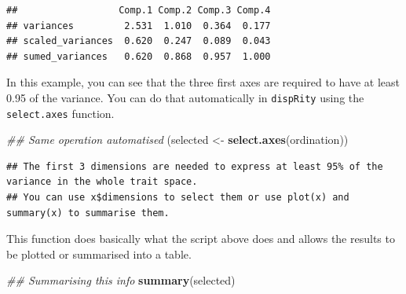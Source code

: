 \documentclass[
]{book}
\newenvironment{Shaded}{\begin{snugshade}}{\end{snugshade}}
\newcommand{\CommentTok}[1]{\textcolor[rgb]{0.56,0.35,0.01}{\textit{#1}}}
\newcommand{\DecValTok}[1]{\textcolor[rgb]{0.00,0.00,0.81}{#1}}
\newcommand{\KeywordTok}[1]{\textcolor[rgb]{0.13,0.29,0.53}{\textbf{#1}}}
\newcommand{\NormalTok}[1]{#1}
\newcommand{\OperatorTok}[1]{\textcolor[rgb]{0.81,0.36,0.00}{\textbf{#1}}}
\newcommand{\StringTok}[1]{\textcolor[rgb]{0.31,0.60,0.02}{#1}}
\begin{document}
\begin{Shaded}
\end{Shaded}

\begin{verbatim}
##                  Comp.1 Comp.2 Comp.3 Comp.4
## variances         2.531  1.010  0.364  0.177
## scaled_variances  0.620  0.247  0.089  0.043
## sumed_variances   0.620  0.868  0.957  1.000
\end{verbatim}

In this example, you can see that the three first axes are required to have at least 0.95 of the variance.
You can do that automatically in \texttt{dispRity} using the \texttt{select.axes} function.

\begin{Shaded}
\begin{Highlighting}[]
\CommentTok{\#\# Same operation automatised}
\NormalTok{(selected \textless{}{-}}\StringTok{ }\KeywordTok{select.axes}\NormalTok{(ordination))}
\end{Highlighting}
\end{Shaded}

\begin{verbatim}
## The first 3 dimensions are needed to express at least 95% of the variance in the whole trait space.
## You can use x$dimensions to select them or use plot(x) and summary(x) to summarise them.
\end{verbatim}

This function does basically what the script above does and allows the results to be plotted or summarised into a table.

\begin{Shaded}
\begin{Highlighting}[]
\CommentTok{\#\# Summarising this info}
\KeywordTok{summary}\NormalTok{(selected)}
\end{Highlighting}
\end{Shaded}
\end{document}
